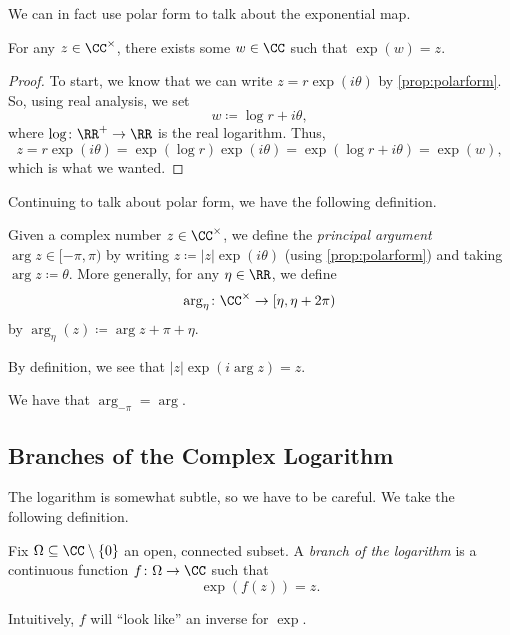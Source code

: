 We can in fact use polar form to talk about the exponential map.
\begin{corollary} \label{cor:expsurj}
	For any $z\in\CC^\times$, there exists some $w\in\CC$ such that $\exp(w)=z$.
\end{corollary}
\begin{proof}
	To start, we know that we can write $z=r\exp(i\theta)$ by \autoref{prop:polarform}. So, using real analysis, we set
	\[w\coloneqq \log r+i\theta,\]
	where $\log\colon \RR^+\to\RR$ is the real logarithm. Thus,
	\[z=r\exp(i\theta)=\exp(\log r)\exp(i\theta)=\exp(\log r+i\theta)=\exp(w),\]
	which is what we wanted.
\end{proof}
Continuing to talk about polar form, we have the following definition.
\begin{definition}[Argument]
	Given a complex number $z\in\CC^\times$, we define the \textit{principal argument} $\arg z\in[-\pi,\pi)$ by writing $z\coloneqq |z|\exp(i\theta)$ (using \autoref{prop:polarform}) and taking $\arg z\coloneqq \theta$. More generally, for any $\eta\in\RR$, we define
	\[\arg_\eta\colon \CC^\times\to[\eta,\eta+2\pi)\]
	by $\arg_\eta(z)\coloneqq \arg z+\pi+\eta$.
\end{definition}
\begin{remark}[Nir] \label{rem:unwindingarg}
	By definition, we see that $|z|\exp(i\arg z)=z$.
\end{remark}
\begin{example}
	We have that $\arg_{-\pi}=\arg$.
\end{example}

\subsection{Branches of the Complex Logarithm}
The logarithm is somewhat subtle, so we have to be careful. We take the following definition.
\begin{definition}
	Fix $\Omega\subseteq\CC\setminus\{0\}$ an open, connected subset. A \textit{branch of the logarithm} is a continuous function $f\colon \Omega\to\CC$ such that
	\[\exp(f(z))=z.\] 
\end{definition}
Intuitively, $f$ will ``look like'' an inverse for $\exp$.

